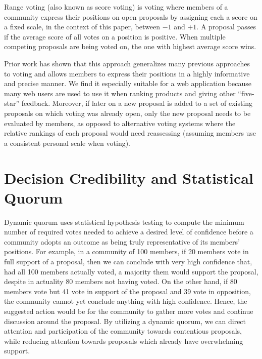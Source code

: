 \documentclass[chi_draft]{sigchi}
\begin{document}
Range voting (also known as score voting) is voting where members of a community express their positions on open proposals by assigning
each a score on a fixed scale, in the context of this paper, between $-1$ and $+1$.
A proposal passes if the average score of all votes on a position is positive.
When multiple competing proposals are being voted on, the one with highest average score wins.

Prior work has shown that this approach generalizes many previous approaches to voting and allows members to express their
positions in a highly informative and precise manner.
We find it especially suitable for a web application because many web users are used to use it when ranking products
and giving other ``five-star'' feedback.
Moreover, if later on a new proposal is added to a set of existing proposals on which voting was already open, only the
new proposal needs to be evaluated by members, as opposed to alternative voting systems where the relative rankings of
each proposal would need reassessing (assuming members use a consistent personal scale when voting).

\section{Decision Credibility and Statistical Quorum}
\label{sec:statistical-quorum}


Dynamic quorum uses statistical hypothesis testing to compute the minimum number of required votes needed
to achieve a desired level of confidence before a community adopts an outcome as being truly representative of
its members' positions.
For example, in a community of 100 members, if 20 members vote in full support of a proposal, then we can conclude
with very high confidence that, had all 100 members actually voted, a majority them would support the proposal,
despite in actuality 80 members not having voted.
On the other hand, if 80 members vote but 41 vote in support of the proposal and 39 vote in opposition,
the community cannot yet conclude anything with high confidence.
Hence, the suggested action would be for the community to gather more votes and continue discussion around the proposal.
By utilizing a dynamic quorum, we can direct attention and participation of the community towards contentious proposals,
while reducing attention towards proposals which already have overwhelming support.
\end{document}
